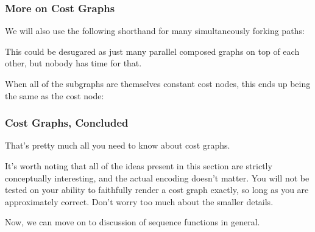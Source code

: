 \documentclass[aspectratio=169]{beamer}
\newcommand{\hex}[4][]{\node[hex, #1, minimum size=1cm] (#2) {$W$: #3 \\ $S$: #4}}
\begin{document}
\begin{frame}[fragile]
  \frametitle{More on Cost Graphs}

  We will also use the following shorthand for many simultaneously
  forking paths:

  \begin{center}
  \end{center}

  \pause
  \vspace{\fill}

  This could be desugared as just many parallel composed graphs on top of each
  other, but nobody has time for that.

  \pause
  \vspace{\fill}

  When all of the subgraphs are themselves constant cost nodes, this ends up being
  the same as the cost node:
  \begin{center}
  \end{center}
\end{frame}

\begin{frame}[fragile]
  \frametitle{Cost Graphs, Concluded}

  That's pretty much all you need to know about cost graphs.

  \pause
  \vspace{\fill}

  It's worth noting that all of the ideas present in this section
  are strictly conceptually interesting, and the actual encoding doesn't
  matter. You will not be tested on your ability to faithfully render a
  cost graph exactly, so long as you are approximately correct. Don't
  worry too much about the smaller details.

  \pause
  \vspace{\fill}

  Now, we can move on to discussion of sequence functions in general.
\end{frame}
\end{document}

